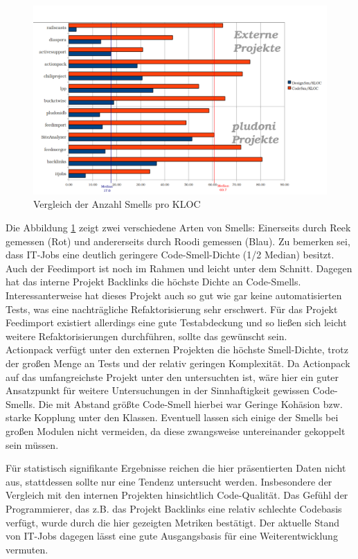 \begin{figure}[htbp]
 \centering
 \includegraphics[width=\linewidth]{./diagrams/cpm-smells.pdf}
 \caption{Vergleich der Anzahl Smells pro KLOC}
 \label{fig:cpm-smells}
\end{figure}
Die Abbildung \ref{fig:cpm-smells} zeigt zwei verschiedene Arten von Smells: Einerseits durch Reek gemessen (Rot) und andererseits durch Roodi gemessen (Blau). Zu bemerken sei, dass IT-Jobs eine deutlich geringere Code-Smell-Dichte (1/2 Median) besitzt. Auch der Feedimport ist noch im Rahmen und leicht unter dem Schnitt. Dagegen hat das interne Projekt Backlinks die höchste Dichte an Code-Smells. Interessanterweise hat dieses Projekt auch so gut wie gar keine automatisierten Tests, was eine nachträgliche Refaktorisierung sehr erschwert. Für das Projekt Feedimport existiert allerdings eine gute Testabdeckung und so ließen sich leicht weitere Refaktorisierungen durchführen, sollte das gewünscht sein. \\
Actionpack verfügt unter den externen Projekten die höchste Smell-Dichte, trotz der großen Menge an Tests und der relativ geringen Komplexität. Da Actionpack auf das umfangreichste Projekt unter den untersuchten ist, wäre hier ein guter Ansatzpunkt für weitere Untersuchungen in der Sinnhaftigkeit gewissen Code-Smells. Die mit Abstand größte Code-Smell hierbei war Geringe Kohäsion bzw. starke Kopplung unter den Klassen. Eventuell lassen sich einige der Smells bei großen Modulen nicht vermeiden, da diese zwangsweise untereinander gekoppelt sein müssen.



Für statistisch signifikante Ergebnisse reichen die hier präsentierten Daten nicht aus, stattdessen sollte nur eine Tendenz untersucht werden. Insbesondere der Vergleich mit den internen Projekten hinsichtlich Code-Qualität. Das Gefühl der Programmierer, das z.B. das Projekt Backlinks eine relativ schlechte Codebasis verfügt, wurde durch die hier gezeigten Metriken bestätigt. Der aktuelle Stand von IT-Jobs dagegen lässt eine gute Ausgangsbasis für eine Weiterentwicklung vermuten.


